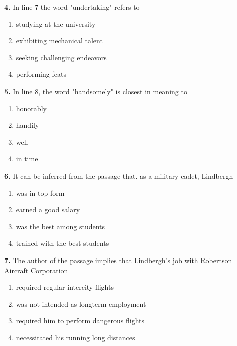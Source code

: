 \documentclass[12pt]{article}
\begin{document}
\par
\vspace{0.25\baselineskip}
\noindent\textbf{4.} In line 7 the word "undertaking" refers to
\begin{enumerate}[label=(\Alph*),leftmargin=*,itemsep=0.2em]
\item studying at the university
\item exhibiting mechanical talent
\item seeking challenging endeavors
\item performing feats
\end{enumerate}
\par
\vspace{0.25\baselineskip}
\noindent\textbf{5.} In line 8, the word "handsomely" is closest in meaning to
\begin{enumerate}[label=(\Alph*),leftmargin=*,itemsep=0.2em]
\item honorably
\item handily
\item well
\item in time
\end{enumerate}
\par
\vspace{0.25\baselineskip}
\noindent\textbf{6.} It can be inferred from the passage that. as a military cadet, Lindbergh
\begin{enumerate}[label=(\Alph*),leftmargin=*,itemsep=0.2em]
\item was in top form
\item earned a good salary
\item was the best among students
\item trained with the best students
\end{enumerate}
\par
\vspace{0.25\baselineskip}
\noindent\textbf{7.} The author of the passage implies that Lindbergh's job with Robertson Aircraft Corporation
\begin{enumerate}[label=(\Alph*),leftmargin=*,itemsep=0.2em]
\item required regular intercity flights
\item was not intended as longterm employment
\item required him to perform dangerous flights
\item necessitated his running long distances
\end{enumerate}
\par
\vspace{0.25\baselineskip}
\end{document}
